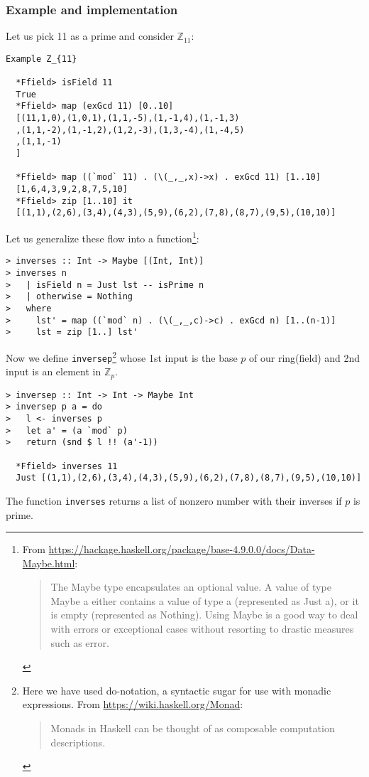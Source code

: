 \documentclass[11pt]{book}
\begin{document}
\subsubsection{Example and implementation}
Let us pick 11 as a prime and consider $\mathbb{Z}_{11}$:
\begin{verbatim}
Example Z_{11}

  *Ffield> isField 11
  True
  *Ffield> map (exGcd 11) [0..10]
  [(11,1,0),(1,0,1),(1,1,-5),(1,-1,4),(1,-1,3)
  ,(1,1,-2),(1,-1,2),(1,2,-3),(1,3,-4),(1,-4,5)
  ,(1,1,-1)
  ]

  *Ffield> map ((`mod` 11) . (\(_,_,x)->x) . exGcd 11) [1..10] 
  [1,6,4,3,9,2,8,7,5,10]
  *Ffield> zip [1..10] it
  [(1,1),(2,6),(3,4),(4,3),(5,9),(6,2),(7,8),(8,7),(9,5),(10,10)]
\end{verbatim}
Let us generalize these flow into a function\footnote{
From \url{https://hackage.haskell.org/package/base-4.9.0.0/docs/Data-Maybe.html}:
\begin{quotation}
The Maybe type encapsulates an optional value. 
A value of type Maybe a either contains a value of type a (represented as Just a), or it is empty (represented as Nothing). 
Using Maybe is a good way to deal with errors or exceptional cases without resorting to drastic measures such as error.
\end{quotation}
}:
\begin{verbatim}
> inverses :: Int -> Maybe [(Int, Int)]
> inverses n
>   | isField n = Just lst -- isPrime n
>   | otherwise = Nothing
>   where
>     lst' = map ((`mod` n) . (\(_,_,c)->c) . exGcd n) [1..(n-1)]
>     lst = zip [1..] lst'
\end{verbatim}
Now we define \texttt{inversep}\footnote{
Here we have used do-notation, a syntactic sugar for use with monadic expressions.
From \url{https://wiki.haskell.org/Monad}:
\begin{quotation}
Monads in Haskell can be thought of as composable computation descriptions.
\end{quotation}
} whose 1st input is the base $p$ of our ring(field) and 2nd input is an element in $\mathbb{Z}_p$.
\begin{verbatim}
> inversep :: Int -> Int -> Maybe Int
> inversep p a = do
>   l <- inverses p
>   let a' = (a `mod` p)
>   return (snd $ l !! (a'-1)) 
   
  *Ffield> inverses 11
  Just [(1,1),(2,6),(3,4),(4,3),(5,9),(6,2),(7,8),(8,7),(9,5),(10,10)]
\end{verbatim}
The function \texttt{inverses} returns a list of nonzero number with their inverses if $p$ is prime.
\end{document}
